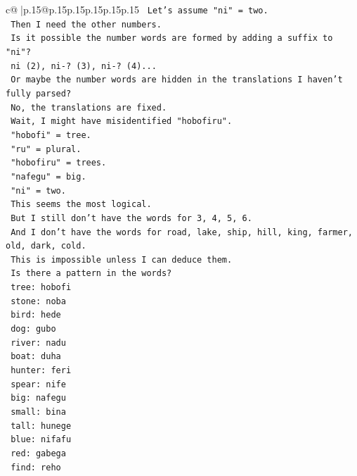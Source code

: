 \documentclass{article}
\begin{document}
{\begin{supertabular}{c@{$\;$}|p{.15\linewidth}@{}p{.15\linewidth}p{.15\linewidth}p{.15\linewidth}p{.15\linewidth}p{.15\linewidth}}
{{{\texttt{        Let's assume "ni" = two.} \\
\texttt{        Then I need the other numbers.} \\
\texttt{        Is it possible the number words are formed by adding a suffix to "ni"?} \\
\texttt{        ni (2), ni{-}? (3), ni{-}? (4)...} \\
\texttt{        Or maybe the number words are hidden in the translations I haven't fully parsed?} \\
\texttt{        No, the translations are fixed.} \\
\texttt{        Wait, I might have misidentified "hobofiru".} \\
\texttt{        "hobofi" = tree.} \\
\texttt{        "ru" = plural.} \\
\texttt{        "hobofiru" = trees.} \\
\texttt{        "nafegu" = big.} \\
\texttt{        "ni" = two.} \\
\texttt{        This seems the most logical.} \\
\texttt{        But I still don't have the words for 3, 4, 5, 6.} \\
\texttt{        And I don't have the words for road, lake, ship, hill, king, farmer, old, dark, cold.} \\
\texttt{        This is impossible unless I can deduce them.} \\
\texttt{        Is there a pattern in the words?} \\
\texttt{        tree: hobofi} \\
\texttt{        stone: noba} \\
\texttt{        bird: hede} \\
\texttt{        dog: gubo} \\
\texttt{        river: nadu} \\
\texttt{        boat: duha} \\
\texttt{        hunter: feri} \\
\texttt{        spear: nife} \\
\texttt{        big: nafegu} \\
\texttt{        small: bina} \\
\texttt{        tall: hunege} \\
\texttt{        blue: nifafu} \\
\texttt{        red: gabega} \\
\texttt{        find: reho} \\
}}}
\end{supertabular}}
\end{document}
